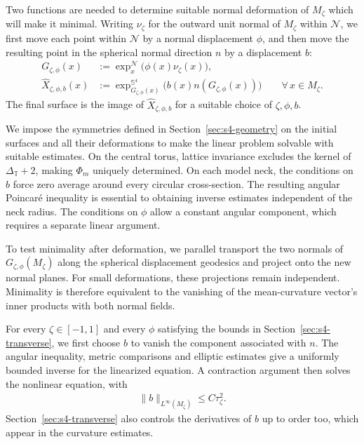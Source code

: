 \documentclass[a4paper,11pt,oneside,reqno]{amsart}
\numberwithin{equation}{section}
\theoremstyle{definition}
\begin{document}
Two functions are needed to determine suitable normal deformation of $M_{\zeta}$ which will make it minimal.
Writing $\nu_\zeta$ for the outward unit normal of $M_{\zeta}$
within $\mathcal N$, we first move each point within
$\mathcal N$ by a normal displacement $\phi$, and
then move the resulting point in the spherical
normal direction $n$ by a displacement $b$:
%
\begin{align*}
    G_{\zeta,\phi}(x)
    &:=
    \exp_x^{\mathcal N}
    \bigl(\phi(x)\nu_\zeta(x)\bigr),\\
    \widehat X_{\zeta,\phi,b}(x)
    &:=
    \exp_{G_{\zeta,\phi}(x)}^{\mathbb S^4}
    \bigl(b(x)n(G_{\zeta,\phi}(x))\bigr)
    \qquad\forall\,x\in M_\zeta.
\end{align*}
%
The final surface is the image of
$\widehat X_{\zeta,\phi,b}$ for a suitable choice of
$\zeta,\phi,b$.

We impose the symmetries defined in Section~\ref{sec:s4-geometry} on the initial surfaces and all their deformations to make the linear problem solvable with suitable estimates. On the central torus,
lattice invariance excludes the kernel of
$\Delta_{\mathbb T}+2$, making $\Phi_m$ uniquely
determined. On each model neck, the conditions on
$b$ force zero average around every circular
cross-section. The resulting angular Poincar\'e
inequality is essential to obtaining inverse
estimates independent of the neck radius.
The conditions on $\phi$ allow a constant angular
component, which requires a separate linear argument.

To test minimality after deformation, we parallel
transport the two normals of
$G_{\zeta,\phi}(M_\zeta)$ along the spherical
displacement geodesics and project onto the new
normal planes. For small deformations, these
projections remain independent. Minimality is
therefore equivalent to the vanishing of the
mean-curvature vector's inner products with both
normal fields.

For every $\zeta\in[-1,1]$ and every $\phi$ satisfying
the bounds in Section~\ref{sec:s4-transverse},
we first choose $b$ to vanish the component associated with $n$.
The angular inequality, metric comparisons and
elliptic estimates give a uniformly bounded inverse
for the linearized equation.
A contraction argument then solves the nonlinear
equation, with
%
\begin{align*}
    \|b\|_{L^\infty(M_\zeta)}\leq C\tau_\zeta^2.
\end{align*}
%
Section~\ref{sec:s4-transverse} also controls the derivatives of $b$ up to order too, which appear in the curvature estimates.
\end{document}
